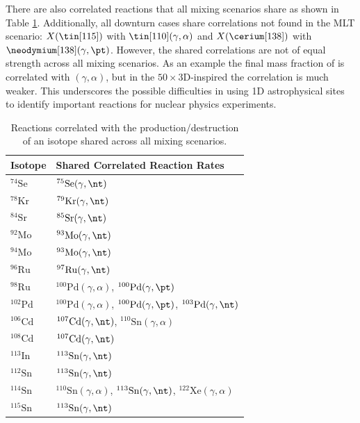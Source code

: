 There are also correlated reactions that all mixing scenarios share as shown in Table \ref{tab:shared_rates}.
Additionally, all downturn cases share correlations not found in the MLT scenario: $X(\tin[115])$ with $\tin[110](\gamma,\alpha)$ and $X(\cerium[138])$ with $\neodymium[138](\gamma,\pt)$. 
However, the shared correlations are not of equal strength across all mixing scenarios. 
As an example the final mass fraction of \dysprosium[156] is correlated with \erbium[160]$(\gamma,\alpha)$, but in the $50\times$3D-inspired the correlation is much weaker.
This underscores the possible difficulties in using 1D astrophysical sites to identify important reactions for nuclear physics experiments.

\begin{table}[!htb]
\caption{Reactions correlated with the production/destruction of an isotope shared across all mixing scenarios.
\label{tab:shared_rates}}
\centering
\begin{tabular}{ll}
\hline
\textbf{Isotope} & \textbf{Shared Correlated Reaction Rates} \\
\hline
$^{74}\mathrm{Se}$ & $^{75}\mathrm{Se}(\gamma,\nt)$ \\
$^{78}\mathrm{Kr}$ & $^{79}\mathrm{Kr}(\gamma,\nt)$ \\
$^{84}\mathrm{Sr}$ & $^{85}\mathrm{Sr}(\gamma,\nt)$ \\
$^{92}\mathrm{Mo}$ & $^{93}\mathrm{Mo}(\gamma,\nt)$ \\
$^{94}\mathrm{Mo}$ & $^{93}\mathrm{Mo}(\gamma,\nt)$ \\
$^{96}\mathrm{Ru}$ & $^{97}\mathrm{Ru}(\gamma,\nt)$ \\
$^{98}\mathrm{Ru}$ & $^{100}\mathrm{Pd}(\gamma,\alpha)$, $^{100}\mathrm{Pd}(\gamma,\pt)$ \\
$^{102}\mathrm{Pd}$ & $^{100}\mathrm{Pd}(\gamma,\alpha)$, $^{100}\mathrm{Pd}(\gamma,\pt)$, $^{103}\mathrm{Pd}(\gamma,\nt)$ \\
$^{106}\mathrm{Cd}$ & $^{107}\mathrm{Cd}(\gamma,\nt)$, $^{110}\mathrm{Sn}(\gamma,\alpha)$ \\
$^{108}\mathrm{Cd}$ & $^{107}\mathrm{Cd}(\gamma,\nt)$ \\
$^{113}\mathrm{In}$ & $^{113}\mathrm{Sn}(\gamma,\nt)$ \\
$^{112}\mathrm{Sn}$ & $^{113}\mathrm{Sn}(\gamma,\nt)$ \\
$^{114}\mathrm{Sn}$ & $^{110}\mathrm{Sn}(\gamma,\alpha)$, $^{113}\mathrm{Sn}(\gamma,\nt)$, $^{122}\mathrm{Xe}(\gamma,\alpha)$ \\
$^{115}\mathrm{Sn}$ & $^{113}\mathrm{Sn}(\gamma,\nt)$ \\

\end{tabular}
\end{table}
